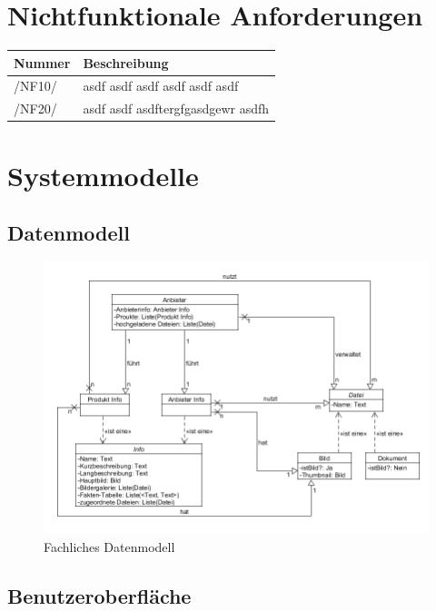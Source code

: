 \documentclass[a4paper,12pt]{article}
\newcommand\addrow[2]{#1 &#2\\ }
\newcommand\addheading[2]{#1 &#2\\ \hline}
\newcommand\tabularhead{\begin{tabular}{lp{13cm}}
\hline
}
\newenvironment{usecase}{\tabularhead}
{\hline\end{tabular}}
\begin{document}
\section{Nichtfunktionale Anforderungen}
\begin{usecase}
  \addheading{Nummer}{Beschreibung} 
  \addrow{/NF10/}{asdf asdf asdf asdf asdf asdf }
  \addrow{/NF20/}{ asdf asdf asdftergfgasdgewr asdfh}
\end{usecase}

\clearpage

\section{Systemmodelle}

\subsection{Datenmodell}

\begin{figure}[!htb]
  \centering
     \includegraphics[width=1.0\textwidth]{FDM.png}
  \caption{Fachliches Datenmodell}
  \label{fig:fmd}
\end{figure}

\clearpage

\subsection{Benutzeroberfläche}
\end{document}
